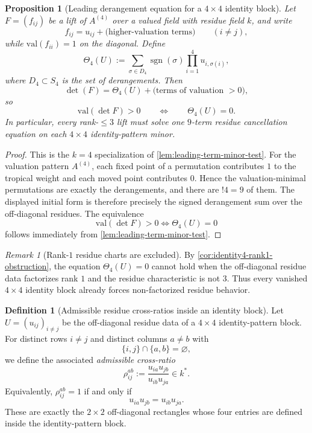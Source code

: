 \documentclass[11pt]{amsart}
\numberwithin{equation}{section}
\theoremstyle{plain}
\newtheorem{proposition}[theorem]{Proposition}
\theoremstyle{definition}
\newtheorem{definition}[theorem]{Definition}
\theoremstyle{remark}
\newtheorem{remark}[theorem]{Remark}
\newcommand{\val}{\mathrm{val}}
\begin{document}
\begin{proposition}[Leading derangement equation for a $4\times4$ identity block]
\label{prop:identity4-theta-equation}
Let $F=(f_{ij})$ be a lift of $A^{(4)}$ over a valued field with residue field $k$, and write
\[
f_{ij}=u_{ij}+\text{(higher-valuation terms)}\qquad (i\neq j),
\]
while $\val(f_{ii})=1$ on the diagonal.
Define
\[
\Theta_4(U):=\sum_{\sigma\in D_4}\operatorname{sgn}(\sigma)\prod_{i=1}^4 u_{i,\sigma(i)},
\]
where $D_4\subset S_4$ is the set of derangements.
Then
\[
\det(F)=\Theta_4(U)+\text{(terms of valuation }>0),
\]
so
\[
\val(\det F)>0
\qquad\Longleftrightarrow\qquad
\Theta_4(U)=0.
\]
In particular, every rank-$\le 3$ lift must solve one $9$-term residue cancellation equation on each $4\times4$ identity-pattern minor.
\end{proposition}

\begin{proof}
This is the $k=4$ specialization of \cref{lem:leading-term-minor-test}. For the valuation pattern $A^{(4)}$, each fixed point of a permutation contributes $1$ to the tropical weight and each moved point contributes $0$. Hence the valuation-minimal permutations are exactly the derangements, and there are $!4=9$ of them. The displayed initial form is therefore precisely the signed derangement sum over the off-diagonal residues. The equivalence
\[
\val(\det F)>0 \iff \Theta_4(U)=0
\]
follows immediately from \cref{lem:leading-term-minor-test}.
\end{proof}

\begin{remark}[Rank-$1$ residue charts are excluded]
\label{rem:identity4-rank1-excluded}
By \cref{cor:identity4-rank1-obstruction}, the equation $\Theta_4(U)=0$ cannot hold when the off-diagonal residue data factorizes rank $1$ and the residue characteristic is not $3$. Thus every vanished $4\times4$ identity block already forces non-factorized residue behavior.
\end{remark}

\begin{definition}[Admissible residue cross-ratios inside an identity block]
\label{def:identity4-admissible-crossratio}
Let $U=(u_{ij})_{i\neq j}$ be the off-diagonal residue data of a $4\times4$ identity-pattern block.
For distinct rows $i\neq j$ and distinct columns $a\neq b$ with
\[
\{i,j\}\cap\{a,b\}=\varnothing,
\]
we define the associated \emph{admissible cross-ratio}
\[
\rho_{ij}^{ab}:=\frac{u_{ia}u_{jb}}{u_{ib}u_{ja}}\in k^*.
\]
Equivalently, $\rho_{ij}^{ab}=1$ if and only if
\[
u_{ia}u_{jb}=u_{ib}u_{ja}.
\]
These are exactly the $2\times2$ off-diagonal rectangles whose four entries are defined inside the identity-pattern block.
\end{definition}
\end{document}
